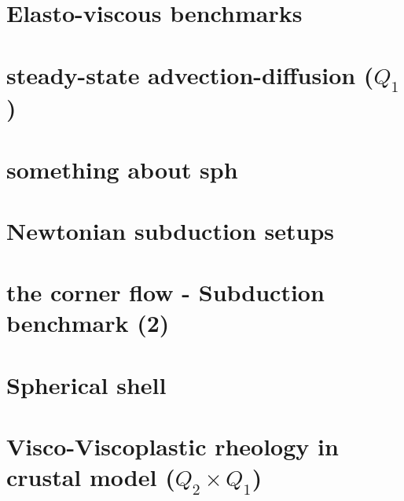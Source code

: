 \documentclass[a4paper,11pt]{report}
\begin{document}
\chapter{Elasto-viscous benchmarks \label{f64}} %

\chapter{steady-state advection-diffusion ($Q_1$) \label{f65}} %

\chapter{something about sph \label{f66}} %

\chapter{Newtonian subduction setups \label{f67}} %

\chapter{the corner flow - Subduction benchmark (2) \label{f68}} %

\chapter{Spherical shell \label{f69}} %

\chapter{Visco-Viscoplastic rheology in crustal model ($Q_2\times Q_1$)\label{f70}} %
\end{document}
